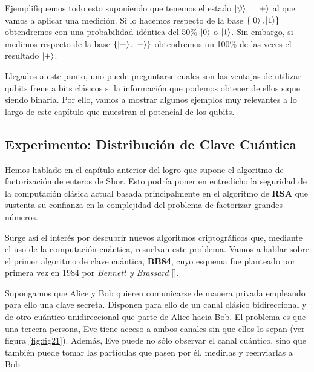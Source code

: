 Ejemplifiquemos todo esto suponiendo que tenemos el estado $\left|\psi\right\rangle=\left|+\right\rangle$ al que vamos a aplicar una medición. Si lo hacemos respecto de la base $\{\left|0\right\rangle,\left|1\right\rangle\}$ obtendremos con una probabilidad idéntica del 50\% $\left|0\right\rangle$ o $\left|1\right\rangle$. Sin embargo, si medimos respecto de la base $\{\left|+\right\rangle,\left|-\right\rangle\}$ obtendremos un 100\% de las veces el resultado $\left|+\right\rangle$. 

Llegados a este punto, uno puede preguntarse cuales son las ventajas de utilizar qubits frene a bits clásicos si la información que podemos obtener de ellos sique siendo binaria. Por ello, vamos a mostrar algunos ejemplos muy relevantes a lo largo de este capítulo que muestran el potencial de los qubits.

\subsection{Experimento: Distribución de Clave Cuántica}

Hemos hablado en el capítulo anterior del logro que supone el algoritmo de factorización de enteros de Shor. Esto podría poner en entredicho la seguridad de la computación clásica actual basada principalmente en el algoritmo de \textbf{RSA} que sustenta su confianza en la complejidad del problema de factorizar grandes números.

Surge así el interés por descubrir nuevos algoritmos criptográficos que, mediante el uso de la computación cuántica, resuelvan este problema. Vamos a hablar sobre el primer algoritmo de clave cuántica, \textbf{BB84}, cuyo esquema fue planteado por primera vez en 1984 por \textit{Bennett y Brassard} [\cite{bennett1987quantum}].

Supongamos que Alice y Bob quieren comunicarse de manera privada empleando para ello una clave secreta. Disponen para ello de un canal clásico bidireccional y de otro cuántico unidireccional que parte de Alice hacia Bob. El problema es que una tercera persona, Eve tiene acceso a ambos canales sin que ellos lo sepan (ver figura \ref{fig:fig21}). Además, Eve puede no sólo observar el canal cuántico, sino que también puede tomar las partículas que pasen por él, medirlas y reenviarlas a Bob.

